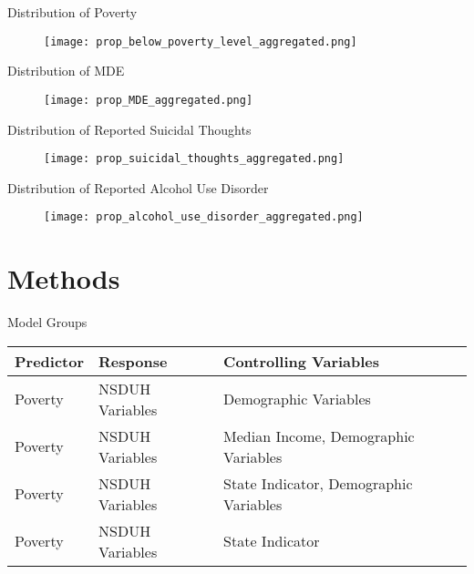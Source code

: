 \documentclass{beamer}
\begin{document}
\begin{frame}{Distribution of Poverty}
\begin{figure}[!htb]
    \centering
    \texttt{[image: prop\_below\_poverty\_level\_aggregated.png]}
\end{figure}
\end{frame}

\begin{frame}{Distribution of MDE}
\begin{figure}[!htb]
    \centering
    \texttt{[image: prop\_MDE\_aggregated.png]}
\end{figure}
\end{frame}

\begin{frame}{Distribution of Reported Suicidal Thoughts}
\begin{figure}[!htb]
    \centering
    \texttt{[image: prop\_suicidal\_thoughts\_aggregated.png]}
\end{figure}
\end{frame}

\begin{frame}{Distribution of Reported Alcohol Use Disorder}
\begin{figure}[!htb]
    \centering
    \texttt{[image: prop\_alcohol\_use\_disorder\_aggregated.png]}
\end{figure}
\end{frame}

\section{Methods}

\begin{frame}{Model Groups}
\begin{table}[t]
\small
\begin{center}
\begin{tabular}{lll}
    \toprule
    Predictor & Response & Controlling Variables\\ 
    \toprule
    Poverty & NSDUH Variables & Demographic Variables\\
    \midrule
    Poverty & NSDUH Variables & Median Income, Demographic Variables\\
    Poverty & NSDUH Variables & State Indicator, Demographic Variables\\
    Poverty & NSDUH Variables & State Indicator\\
    \bottomrule
\end{tabular}
\end{center}
\end{table}
\end{frame}
\end{document}
